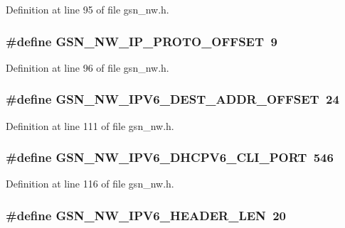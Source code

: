 Definition at line 95 of file gsn\_\-nw.h.

\hypertarget{a00532_a99679d7963b105a5cd3e5147d7e9a975}{
\subsubsection[{GSN\_\-NW\_\-IP\_\-PROTO\_\-OFFSET}]{\setlength{\rightskip}{0pt plus 5cm}\#define GSN\_\-NW\_\-IP\_\-PROTO\_\-OFFSET~9}}
\label{a00532_a99679d7963b105a5cd3e5147d7e9a975}


Definition at line 96 of file gsn\_\-nw.h.

\hypertarget{a00532_ab5593226f9c55aedd8d3c609b37fc253}{
\subsubsection[{GSN\_\-NW\_\-IPV6\_\-DEST\_\-ADDR\_\-OFFSET}]{\setlength{\rightskip}{0pt plus 5cm}\#define GSN\_\-NW\_\-IPV6\_\-DEST\_\-ADDR\_\-OFFSET~24}}
\label{a00532_ab5593226f9c55aedd8d3c609b37fc253}


Definition at line 111 of file gsn\_\-nw.h.

\hypertarget{a00532_a331459b3ebb4da867a8ff8590ea407c4}{
\subsubsection[{GSN\_\-NW\_\-IPV6\_\-DHCPV6\_\-CLI\_\-PORT}]{\setlength{\rightskip}{0pt plus 5cm}\#define GSN\_\-NW\_\-IPV6\_\-DHCPV6\_\-CLI\_\-PORT~546}}
\label{a00532_a331459b3ebb4da867a8ff8590ea407c4}


Definition at line 116 of file gsn\_\-nw.h.

\hypertarget{a00532_ad2c6776a539c7076331f15008f5a9969}{
\subsubsection[{GSN\_\-NW\_\-IPV6\_\-HEADER\_\-LEN}]{\setlength{\rightskip}{0pt plus 5cm}\#define GSN\_\-NW\_\-IPV6\_\-HEADER\_\-LEN~20}}
\label{a00532_ad2c6776a539c7076331f15008f5a9969}


